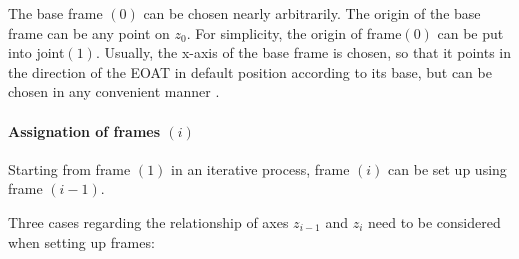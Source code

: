 The base frame $(0)$ can be chosen nearly arbitrarily. The origin of the base frame can be any point on $z_0$. For simplicity, the origin of frame$(0)$ can be put into joint$(1)$.  Usually, the x-axis of the base frame is chosen, so that it points in the direction of the \ac{EOAT} in default position according to its base, \cite{DenavitHartenbergKonventionen} but can be chosen in any convenient manner \cite{SpongDynContr}.

\paragraph{Assignation of frames $(i)$}

Starting from frame $(1)$ in an iterative process, frame $(i)$ can be set up using frame $(i-1)$.

Three cases regarding the relationship of axes $z_{i-1}$ and $z_i$  need to be considered when setting up frames:
